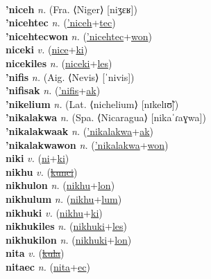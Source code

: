  \label{nicelyan} \\
\textbf{'niceh} \textit{n.} (Fra. ⟨Niger⟩ [niʒɛʁ])
 \label{'niceh} \\
\textbf{'nicehtec} \textit{n.} (\hyperref['niceh]{'niceh}+\hyperref[tec]{tec})
 \label{'nicehtec} \\
\textbf{'nicehtecwon} \textit{n.} (\hyperref['nicehtec]{'nicehtec}+\hyperref[won]{won})
 \label{'nicehtecwon} \\
\textbf{niceki} \textit{v.} (\hyperref[nice]{nice}+\hyperref[ki]{ki})
 \label{niceki} \\
\textbf{nicekiles} \textit{n.} (\hyperref[niceki]{niceki}+\hyperref[les]{les})
 \label{nicekiles} \\
\textbf{'nifis} \textit{n.} (Aig. ⟨Nevis⟩ [ˈnivis])
 \label{'nifis} \\
\textbf{'nifisak} \textit{n.} (\hyperref['nifis]{'nifis}+\hyperref[ak]{ak})
 \label{'nifisak} \\
\textbf{'nikelium} \textit{n.} (Lat. ⟨nichelium⟩ [nɪkelɪʊ̃])
 \label{'nikelium} \\
\textbf{'nikalakwa} \textit{n.} (Spa. ⟨Nicaragua⟩ [nikaˈɾaɣwa])
 \label{'nikalakwa} \\
\textbf{'nikalakwaak} \textit{n.} (\hyperref['nikalakwa]{'nikalakwa}+\hyperref[ak]{ak})
 \label{'nikalakwaak} \\
\textbf{'nikalakwawon} \textit{n.} (\hyperref['nikalakwa]{'nikalakwa}+\hyperref[won]{won})
 \label{'nikalakwawon} \\
\textbf{niki} \textit{v.} (\hyperref[ni]{ni}+\hyperref[ki]{ki})
 \label{niki} \\
\textbf{nikhu} \textit{v.} (\hyperref[kunci]{\sout{kunci}})
 \label{nikhu} \\
\textbf{nikhulon} \textit{n.} (\hyperref[nikhu]{nikhu}+\hyperref[lon]{lon})
 \label{nikhulon} \\
\textbf{nikhulum} \textit{n.} (\hyperref[nikhu]{nikhu}+\hyperref[lum]{lum})
 \label{nikhulum} \\
\textbf{nikhuki} \textit{v.} (\hyperref[nikhu]{nikhu}+\hyperref[ki]{ki})
 \label{nikhuki} \\
\textbf{nikhukiles} \textit{n.} (\hyperref[nikhuki]{nikhuki}+\hyperref[les]{les})
 \label{nikhukiles} \\
\textbf{nikhukilon} \textit{n.} (\hyperref[nikhuki]{nikhuki}+\hyperref[lon]{lon})
 \label{nikhukilon} \\
\textbf{nita} \textit{v.} (\hyperref[kula]{\sout{kula}})
 \label{nita} \\
\textbf{nitaec} \textit{n.} (\hyperref[nita]{nita}+\hyperref[ec]{ec})
